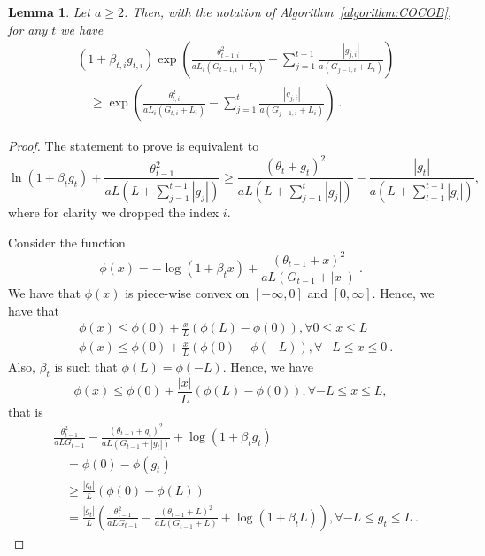 \documentclass{article}
\newtheorem{lemma}{Lemma}
\begin{document}
\begin{lemma}
\label{lemma:recurrence}
Let $a\geq2$. Then, with the notation of Algorithm~\ref{algorithm:COCOB}, for any $t$ we have
\begin{align*}
&(1+\beta_{t,i} g_{t,i}) \exp\left(\frac{\theta_{t-1,i}^2}{a L_i (G_{t-1,i}+L_i)}- \sum_{j=1}^{t-1} \frac{|g_{j,i}|}{a (G_{j-1,i}+L_i)}\right)\\
&\quad \geq \exp\left(\frac{\theta_{t,i}^2}{a L_i (G_{t,i}+L_i)}- \sum_{j=1}^{t} \frac{|g_{j,i}|}{a (G_{j-1,i}+L_i)}\right)~.
\end{align*}
\end{lemma}
\begin{proof}
The statement to prove is equivalent to
\[
\ln(1+\beta_t g_t) + \frac{\theta_{t-1}^2}{a L (L+\sum_{j=1}^{t-1} |g_j|)}
\geq \frac{(\theta_t+g_t)^2}{a L (L+\sum_{j=1}^{t} |g_j|)}- \frac{|g_t|}{a (L+\sum_{l=1}^{t-1} |g_l|)},
\]
where for clarity we dropped the index $i$.

Consider the function 
\[
\phi(x)=-\log(1+\beta_t x) + \frac{(\theta_{t-1}+x)^2}{a L (G_{t-1} + |x|)}~.
\]
We have that $\phi(x)$ is piece-wise convex on $[-\infty,0]$ and $[0,\infty]$. Hence, we have that
\begin{align*}
&\phi(x) \leq \phi(0)+\frac{x}{L} (\phi(L)-\phi(0)), \forall 0 \leq x\leq L\\
&\phi(x) \leq \phi(0)+\frac{x}{L} (\phi(0)-\phi(-L)), \forall -L \leq x\leq 0~.
\end{align*}
Also, $\beta_t$ is such that $\phi(L)=\phi(-L)$.
Hence, we have
\[
\phi(x) \leq \phi(0)+ \frac{|x|}{L} (\phi(L)-\phi(0)), \forall -L \leq x\leq L,
\]
that is
\begin{align*}
&\frac{\theta_{t-1}^2}{a L G_{t-1}}-\frac{(\theta_{t-1}+g_t)^2}{a L (G_{t-1} +  |g_t|)} + \log(1+\beta_t g_t) \\
& \quad = \phi(0) - \phi(g_t) \\
& \quad \geq \frac{|g_t|}{L} \left(\phi(0) - \phi(L)\right) \\
& \quad = \frac{|g_t|}{L} \left(\frac{\theta_{t-1}^2}{a L G_{t-1}} - \frac{(\theta_{t-1}+L)^2}{a L (G_{t-1} + L)} + \log(1+\beta_t L)\right), \forall -L \leq g_t \leq L~.
\end{align*}


\end{proof}
\end{document}
